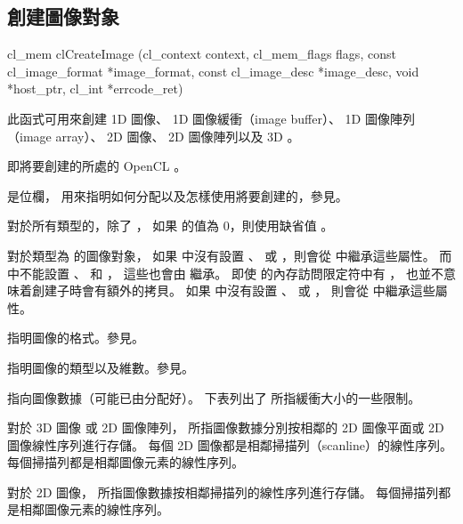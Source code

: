 \subsection{創建圖像對象}


\startCLFUNC
cl_mem clCreateImage (cl_context context,
		cl_mem_flags flags,
		const cl_image_format *image_format,
		const cl_image_desc *image_desc,
		void *host_ptr,
		cl_int *errcode_ret)
\stopCLFUNC

此函式可用來創建 1D 圖像、 1D 圖像緩衝（image buffer）、 1D 圖像陣列（image array）、
2D 圖像、 2D 圖像陣列以及 3D 。

 即將要創建的所處的 OpenCL 。

 是位欄，
用來指明如何分配以及怎樣使用將要創建的，參見。

對於所有類型的，除了 ，
如果  的值為 0，則使用缺省值 。

對於類型為  的圖像對象，
如果  中沒有設置 、 
或 ，則會從  中繼承這些屬性。
而  中不能設置 、
 和 ，
這些也會由  繼承。
即使  的內存訪問限定符中有 ，
也並不意味着創建子時會有額外的拷貝。
如果  中沒有設置 、
 或 ，
則會從  中繼承這些屬性。

 指明圖像的格式。參見。

 指明圖像的類型以及維數。參見。

 指向圖像數據（可能已由分配好）。
下表列出了  所指緩衝大小的一些限制。



對於 3D 圖像 或 2D 圖像陣列，
 所指圖像數據分別按相鄰的 2D 圖像平面或 2D 圖像線性序列進行存儲。
每個 2D 圖像都是相鄰掃描列（scanline）的線性序列。
每個掃描列都是相鄰圖像元素的線性序列。

對於 2D 圖像，
 所指圖像數據按相鄰掃描列的線性序列進行存儲。
每個掃描列都是相鄰圖像元素的線性序列。


